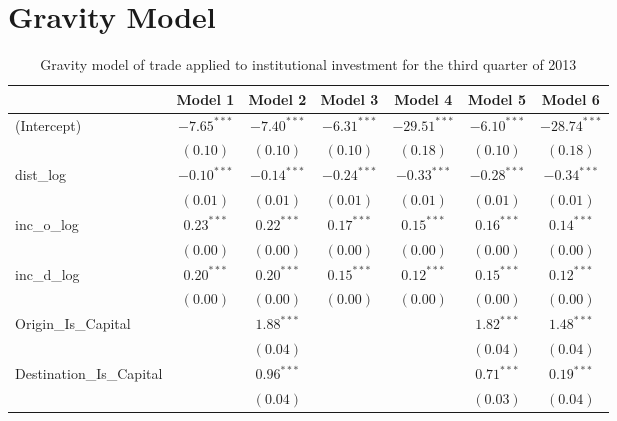 \chapter{Gravity Model}

\label{GravityModelappendix}

\begin{table}
	\small
	\begin{center}
			\caption[Gravity Model of Trade for Q3 2013]{Gravity model of trade applied to institutional investment for the third quarter of 2013}
		
		\begin{tabular}{l c c c c c c }
		\hline
		& Model 1 & Model 2 & Model 3 & Model 4 & Model 5 & Model 6 \\
		\hline
		(Intercept)                  & $-7.65^{***}$ & $-7.40^{***}$ & $-6.31^{***}$ & $-29.51^{***}$ & $-6.10^{***}$ & $-28.74^{***}$ \\
		& $(0.10)$      & $(0.10)$      & $(0.10)$      & $(0.18)$       & $(0.10)$      & $(0.18)$       \\
		dist\_log                    & $-0.10^{***}$ & $-0.14^{***}$ & $-0.24^{***}$ & $-0.33^{***}$  & $-0.28^{***}$ & $-0.34^{***}$  \\
		& $(0.01)$      & $(0.01)$      & $(0.01)$      & $(0.01)$       & $(0.01)$      & $(0.01)$       \\
		inc\_o\_log                  & $0.23^{***}$  & $0.22^{***}$  & $0.17^{***}$  & $0.15^{***}$   & $0.16^{***}$  & $0.14^{***}$   \\
		& $(0.00)$      & $(0.00)$      & $(0.00)$      & $(0.00)$       & $(0.00)$      & $(0.00)$       \\
		inc\_d\_log                  & $0.20^{***}$  & $0.20^{***}$  & $0.15^{***}$  & $0.12^{***}$   & $0.15^{***}$  & $0.12^{***}$   \\
		& $(0.00)$      & $(0.00)$      & $(0.00)$      & $(0.00)$       & $(0.00)$      & $(0.00)$       \\
		Origin\_Is\_Capital          &               & $1.88^{***}$  &               &                & $1.82^{***}$  & $1.48^{***}$   \\
		&               & $(0.04)$      &               &                & $(0.04)$      & $(0.04)$       \\
		Destination\_Is\_Capital     &               & $0.96^{***}$  &               &                & $0.71^{***}$  & $0.19^{***}$   \\
		&               & $(0.04)$      &               &                & $(0.03)$      & $(0.04)$       \\

\end{tabular}
\end{center}
\end{table}
